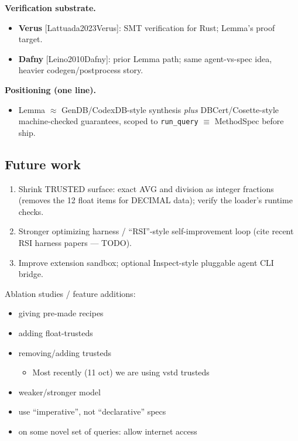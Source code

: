 \documentclass[
  10pt,
]{article}
\providecommand{\tightlist}{%
  \setlength{\itemsep}{0pt}\setlength{\parskip}{0pt}}
\begin{document}
\textbf{Verification substrate.}

\begin{itemize}
\tightlist
\item
  \textbf{Verus} {[}Lattuada2023Verus{]}: SMT verification for Rust;
  Lemma's proof target.
\item
  \textbf{Dafny} {[}Leino2010Dafny{]}: prior Lemma path; same
  agent-vs-spec idea, heavier codegen/postprocess story.
\end{itemize}

\textbf{Positioning (one line).}

\begin{itemize}
\tightlist
\item
  Lemma \ensuremath{\approx} GenDB/CodexDB-style synthesis \emph{plus} DBCert/Cosette-style
  machine-checked guarantees, scoped to \texttt{run\_query} \ensuremath{\equiv} MethodSpec
  before ship.
\end{itemize}

\subsection{Future work}\label{future-work}

\begin{enumerate}
\def\labelenumi{\arabic{enumi}.}
\tightlist
\item
  Shrink TRUSTED surface: exact AVG and division as integer fractions
  (removes the 12 float items for DECIMAL data); verify the loader's
  runtime checks.
\item
  Stronger optimizing harness / ``RSI''-style self-improvement loop
  (cite recent RSI harness papers --- TODO).
\item
  Improve extension sandbox; optional Inspect-style pluggable agent CLI
  bridge.
\end{enumerate}

Ablation studies / feature additions:

\begin{itemize}
\tightlist
\item
  giving pre-made recipes
\item
  adding float-trusteds
\item
  removing/adding trusteds

  \begin{itemize}
  \tightlist
  \item
    Most recently (11 oct) we are using vstd trusteds
  \end{itemize}
\item
  weaker/stronger model
\item
  use ``imperative'', not ``declarative'' specs
\item
  on some novel set of queries: allow internet access
\end{itemize}
\end{document}
